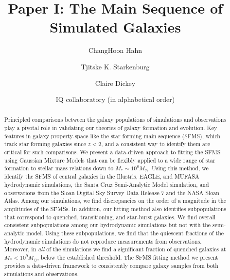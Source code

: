 \documentclass[preprint2,tighten]{aastex62}
\begin{document}
\title{Paper I: The Main Sequence of Simulated Galaxies}
\author{ChangHoon Hahn}
\author{Tjitske K. Starkenburg}
\author{Claire Dickey}

\author{IQ collaboratory (in alphabetical order)}

\begin{abstract}
Principled comparisons between the galaxy populations of simulations and 
observations play a pivotal role in validating our theories of galaxy 
formation and evolution. %
Key features in galaxy property-space like the star forming main sequence
(SFMS), which track %
star forming galaxies since $z<2$,
and a consistent  way to identify them are critical for such comparisons. 
We present a data-driven approach to fitting the SFMS using Gaussian 
Mixture Models that can be flexibly applied to a wide range of star 
formation to stellar mass relations down to $M_*{\sim}10^{8}M_\odot$. %
Using this method, we identify the SFMS of central galaxies in 
the Illustris, EAGLE, and MUFASA hydrodynamic simulations, the Santa Cruz 
Semi-Analytic Model simulation, and observations from the Sloan Digital 
Sky Survey Data Release 7 and the NASA Sloan Atlas. Among our simulations, 
we find discrepancies on the order of a magnitude in the amplitudes of the 
SFMSs. In addition, our fitting method also identifies subpopulations 
that correspond to quenched, transitioning, and star-burst galaxies. We 
find overall consistent subpopulations among our hydrodynamic 
simulations but not with the semi-analytic model. Using these subpopulations, 
we find that the quiescent fractions of the hydrodynamic simulations do 
not reproduce measurements from observations. Moreover, in \emph{all} of the 
simulations we find a significant fraction of quenched galaxies at 
$M_* < 10^9M_\odot$, below the established \cite{geha2012} threshold. The 
SFMS fitting method we present provides a data-driven framework to 
consistently compare galaxy samples from both simulations and observations. 
\end{abstract}
\end{document}
